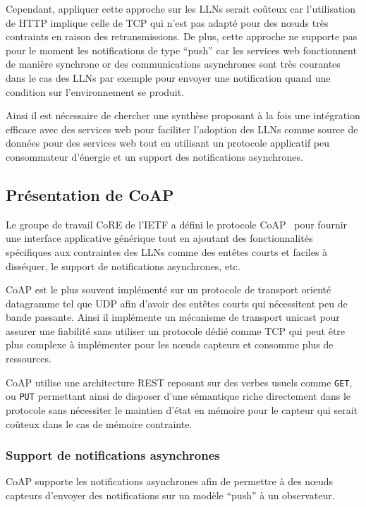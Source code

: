 Cependant, appliquer cette approche sur les \ac{LLN}s serait coûteux car l'utilisation de \ac{HTTP} implique celle de \ac{TCP} qui n'est pas adapté pour des nœuds très contraints en raison des retransmissions.
De plus, cette approche ne supporte pas pour le moment les notifications de type ``push'' car les services web fonctionnent de manière synchrone or des communications asynchrones sont très courantes dans le cas des \ac{LLN}s par exemple pour envoyer une notification quand une condition sur l'environnement se produit.

Ainsi il est nécessaire de chercher une synthèse proposant à la fois une intégration efficace avec des services web pour faciliter l'adoption des \ac{LLN}s comme source de données pour des services web tout en utilisant un protocole applicatif peu consommateur d'énergie et un support des notifications asynchrones.

\subsection{Présentation de \ac{CoAP}}

Le groupe de travail \ac{CoRE} de l'\ac{IETF} a défini le protocole \ac{CoAP}~\cite{rfc7252} pour fournir une interface applicative générique tout en ajoutant des fonctionnalités spécifiques aux contraintes des \ac{LLN}s comme des entêtes courts et faciles à disséquer, le support de notifications asynchrones, etc.

\ac{CoAP} est le plus souvent implémenté sur un protocole de transport orienté datagramme tel que \ac{UDP} afin d'avoir des entêtes courts qui nécessitent peu de bande passante.
Ainsi il implémente un mécanisme de transport unicast pour assurer une fiabilité sans utiliser un protocole dédié comme \ac{TCP} qui peut être plus complexe à implémenter pour les nœuds capteurs et consomme plus de ressources.

\ac{CoAP} utilise une architecture \ac{REST} reposant sur des verbes usuels comme \texttt{GET}, ou \texttt{PUT} permettant ainsi de disposer d'une sémantique riche directement dans le protocole sans nécessiter le maintien d'état en mémoire pour le capteur qui serait coûteux dans le cas de mémoire contrainte.

\subsubsection{Support de notifications asynchrones}

\ac{CoAP} supporte les notifications asynchrones afin de permettre à des nœuds capteurs d'envoyer des notifications sur un modèle ``push'' à un observateur.

